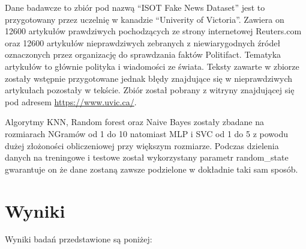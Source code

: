 Dane badawcze to zbiór pod nazwą ``ISOT Fake News Dataset'' jest to przygotowany przez uczelnię w 
kanadzie ``Univerity of Victoria''. Zawiera on 12600 artykułów prawdziwych pochodzących ze strony
internetowej Reuters.com oraz 12600 artykułów nieprawdziwych zebranych z niewiarygodnych źródeł
oznaczonych przez organizację do sprawdzania faktów Politifact. Tematyka artykułów to głównie polityka i wiadomości 
ze świata.  Teksty zawarte w zbiorze zostały wstępnie przygotowane jednak błędy znajdujące się w nieprawdziwych 
artykułach pozostały w tekście. Zbiór został pobrany z witryny znajdującej się pod adresem \url{https://www.uvic.ca/}.~\cite{ISOT}

Algorytmy KNN, Random forest oraz Naive Bayes zostały zbadane na rozmiarach NGramów od 1 do 10 natomiast
MLP i SVC od 1 do 5 z powodu dużej złożoności obliczeniowej przy większym rozmiarze. Podczas
dzielenia danych na treningowe i testowe został wykorzystany parametr random\_state gwarantuje on
że dane zostaną zawsze podzielone w dokładnie taki sam sposób.
\section{Wyniki}
Wyniki badań przedstawione są poniżej: 
\begin{table}[h!]
    \centering
    \caption{Wyniki algorytmu KNN wektoryzacja metodą Bag of words}
\end{table}

